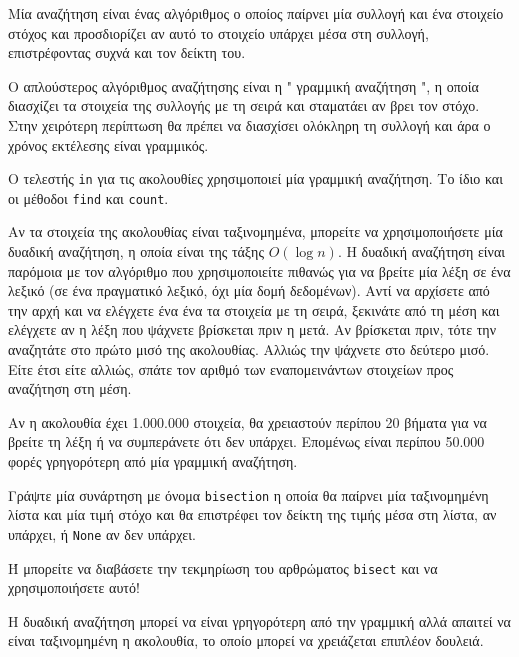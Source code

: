\documentclass[10pt]{book}
\begin{document}
Μία αναζήτηση είναι ένας αλγόριθμος ο οποίος παίρνει μία συλλογή και ένα στοιχείο 
στόχος και προσδιορίζει αν αυτό το στοιχείο υπάρχει μέσα στη συλλογή, επιστρέφοντας συχνά και τον δείκτη του.

Ο απλούστερος αλγόριθμος αναζήτησης είναι η  " γραμμική αναζήτηση ",  
η οποία διασχίζει τα στοιχεία της συλλογής με τη σειρά και σταματάει αν βρει τον στόχο.  Στην χειρότερη περίπτωση θα πρέπει να διασχίσει ολόκληρη τη συλλογή και άρα 
ο χρόνος εκτέλεσης είναι γραμμικός.

Ο τελεστής  {\tt in}  για τις ακολουθίες χρησιμοποιεί μία γραμμική αναζήτηση. 
Το ίδιο και οι μέθοδοι  {\tt find}  και  {\tt count}. 

Αν τα στοιχεία της ακολουθίας είναι ταξινομημένα, μπορείτε να χρησιμοποιήσετε μία 
δυαδική αναζήτηση, η οποία είναι της τάξης $O(\log n)$.  Η δυαδική αναζήτηση είναι παρόμοια με τον αλγόριθμο που χρησιμοποιείτε πιθανώς για να βρείτε μία λέξη σε ένα 
λεξικό (σε ένα πραγματικό λεξικό, όχι μία δομή δεδομένων).  Αντί να αρχίσετε από την αρχή και να ελέγχετε ένα ένα τα στοιχεία με τη σειρά, ξεκινάτε από τη μέση και ελέγχετε αν η λέξη που ψάχνετε βρίσκεται πριν η μετά.  Αν βρίσκεται πριν, τότε την αναζητάτε στο πρώτο μισό της ακολουθίας.  Αλλιώς την ψάχνετε στο δεύτερο μισό.  Είτε έτσι είτε αλλιώς, σπάτε τον αριθμό των εναπομεινάντων στοιχείων προς αναζήτηση στη μέση.

Αν η ακολουθία έχει 1.000.000 στοιχεία, θα χρειαστούν περίπου 20 βήματα για να 
βρείτε τη λέξη ή να συμπεράνετε ότι δεν υπάρχει.  Επομένως είναι περίπου 50.000 φορές γρηγορότερη από μία γραμμική αναζήτηση.


\begin{exercise}

Γράψτε μία συνάρτηση με όνομα  {\tt bisection}  η οποία θα παίρνει μία 
ταξινομημένη λίστα και μία τιμή στόχο και θα επιστρέφει τον δείκτη της τιμής μέσα 
στη λίστα, αν υπάρχει, ή  {\tt None}  αν δεν υπάρχει.

Ή μπορείτε να διαβάσετε την τεκμηρίωση του αρθρώματος  {\tt bisect}  και να 
χρησιμοποιήσετε αυτό!
\end{exercise}

 Η δυαδική αναζήτηση μπορεί να είναι γρηγορότερη από την γραμμική αλλά απαιτεί 
να είναι ταξινομημένη η ακολουθία, το οποίο μπορεί να χρειάζεται επιπλέον δουλειά.
\end{document}
